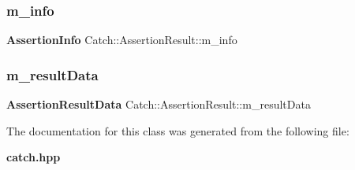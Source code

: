 \subsubsection{m\+\_\+info}
{\footnotesize\ttfamily \textbf{ Assertion\+Info} Catch\+::\+Assertion\+Result\+::m\+\_\+info\hspace{0.3cm}{\ttfamily [protected]}}

\mbox{\label{class_catch_1_1_assertion_result_add3455b8bbedb0d643e18da67c66b4f7}} 
\subsubsection{m\+\_\+result\+Data}
{\footnotesize\ttfamily \textbf{ Assertion\+Result\+Data} Catch\+::\+Assertion\+Result\+::m\+\_\+result\+Data\hspace{0.3cm}{\ttfamily [protected]}}



The documentation for this class was generated from the following file\+:\begin{DoxyCompactItemize}
\item 
\textbf{ catch.\+hpp}\end{DoxyCompactItemize}
